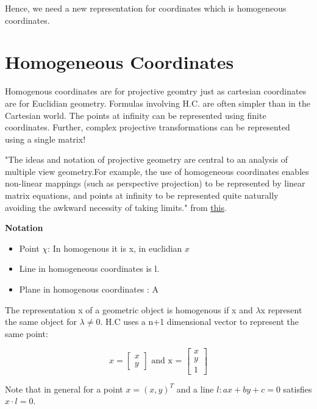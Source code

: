 Hence, we need a new representation for coordinates which is homogeneous coordinates.

\section{Homogeneous Coordinates}

Homogenous coordinates are for projective geomtry just as cartesian coordinates are for Euclidian geometry. Formulas involving H.C. are often simpler than in the Cartesian world. The points at infinity can be represented using finite coordinates. Further, complex projective transformations can be represented using a single matrix! 

"The  ideas and notation of projective geometry are central to an analysis of multiple view geometry.For example, the use of homogeneous coordinates enables non-linear mappings (such as perspective projection) to be represented by linear matrix equations, and points at infinity  to  be  represented  quite  naturally  avoiding  the  awkward  necessity  of  taking limits." from \href{https://github.com/pranjals16/cs676/blob/master/Hartley\%2C\%20Zisserman\%20-\%20Multiple\%20View\%20Geometry\%20in\%20Computer\%20Vision.pdf}{this}.

\textbf{Notation}

\begin{itemize} 
    \item Point $\chi$: In homogenous it is x, in euclidian $x$
    \item Line in homogeneous coordinates is l.
    \item Plane in homogenous coordinates : A
\end{itemize}   

The representation x of a geometric object is homogenous if x and $\lambda$x represent the same object for $\lambda \neq 0$. H.C uses a n+1 dimensional vector to represent the same point:

\begin{equation}
    x = \begin{bmatrix}
    x \\
    y
    \end{bmatrix} \text{ and x = } \begin{bmatrix}
    x \\
    y\\
    1
    \end{bmatrix}
\end{equation}

Note that in general for a point $x = (x, y)^T$ and a line $l: ax + by + c = 0$ satisfies $x \cdot l = 0$. 

